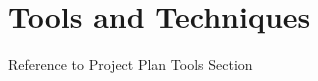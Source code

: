
\chapter{Tools and Techniques} %

\label{Part4Chapter6} %


Reference to Project Plan Tools Section